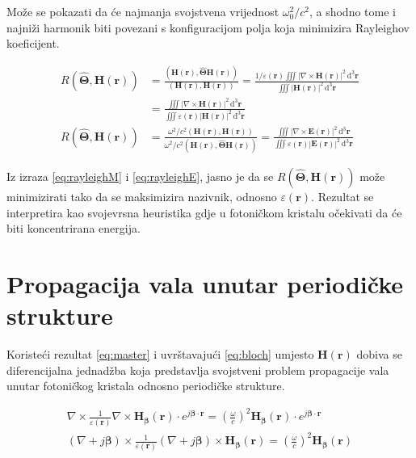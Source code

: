 \documentclass[utf8, seminar]{fer}
\begin{document}
Može se pokazati da će najmanja svojstvena vrijednost $\omega_0^2/c^2$, a
shodno tome i najniži harmonik biti povezani s konfiguracijom polja koja
minimizira Rayleighov koeficijent.

\begin{align} \label{eq:rayleighM}
	R \left( \hat{\mathbf{\Theta}}, \mathbf{H}(\mathbf{r}) \right)
	&= \frac{ \left(
		\mathbf{H}(\mathbf{r}), \hat{\mathbf{\Theta}}\mathbf{H}(\mathbf{r})
		\right)}
	{
		(\mathbf{H}(\mathbf{r}), \mathbf{H}(\mathbf{r}))
	}
	= \frac{ 1/\varepsilon(\mathbf{r})
		\iiint |\nabla \times \mathbf{H}(\mathbf{r})|^2
		\, \mathrm{d}^3\mathbf{r}}
	{\iiint | \mathbf{H}( \mathbf{r} ) |^2
		\, \mathrm{d}^3\mathbf{r}} 								\nonumber \\
	&= \frac{
		\iiint |\nabla \times \mathbf{H}(\mathbf{r})|^2
		\, \mathrm{d}^3\mathbf{r}}
	{\iiint \varepsilon(\mathbf{r}) | \mathbf{H}( \mathbf{r} ) |^2
		\, \mathrm{d}^3\mathbf{r}}										  \\
	R \left( \hat{\mathbf{\Theta}}, \mathbf{H}(\mathbf{r}) \right)
	&= \frac{
		\omega^2/c^2
		\left(
			\mathbf{H}(\mathbf{r}), \mathbf{H}(\mathbf{r})
		\right)
	}
	{
		\omega^2/c^2
		\left(
			\mathbf{H}(\mathbf{r}), \hat{\mathbf{\Theta}}\mathbf{H}(\mathbf{r})
		\right)
	}
	= \frac{
		\iiint |\nabla \times \mathbf{E}(\mathbf{r})|^2
		\, \mathrm{d}^3\mathbf{r}}
	{\iiint \varepsilon(\mathbf{r}) | \mathbf{E}( \mathbf{r} ) |^2
	\, \mathrm{d}^3\mathbf{r}} \label{eq:rayleighE}
\end{align}

Iz izraza \ref{eq:rayleighM} i \ref{eq:rayleighE}, jasno je da se
${R \left( \hat{\mathbf{\Theta}}, \mathbf{H}(\mathbf{r}) \right)}$ može
minimizirati tako da se maksimizira nazivnik, odnosno
${\varepsilon (\mathbf{r})}$. Rezultat se interpretira kao svojevrsna heuristika
gdje u fotoničkom kristalu očekivati da će biti koncentrirana energija.

\section{Propagacija vala unutar periodičke strukture}

Koristeći rezultat \ref{eq:master} i uvrštavajući \ref{eq:bloch} umjesto
$\mathbf{H}(\mathbf{r})$ dobiva se diferencijalna jednadžba koja predstavlja
svojstveni problem propagacije vala unutar fotoničkog kristala odnosno
periodičke strukture.

\begin{align} \label{eq:master_bloch}
	\nabla \times
	\frac{1}{\varepsilon(\mathbf{r})} \nabla \times
	\mathbf{H}_\mathbf{\beta}(\mathbf{r}) \cdot
	e^{j \mathbf{\beta} \cdot \mathbf{r}}
	= \left(
		\frac{\omega}{c}
	\right)^2
	\mathbf{H}_\mathbf{\beta}(\mathbf{r}) \cdot
		e^{j \mathbf{\beta} \cdot \mathbf{r}}	\nonumber \\
	(\nabla + j\mathbf{\beta}) \times
	\frac{1}{\varepsilon(\mathbf{r})}
	(\nabla + j\mathbf{\beta}) \times
	\mathbf{H}_\mathbf{\beta}(\mathbf{r})
	= \left(
		\frac{\omega}{c}
	\right)^2
	\mathbf{H}_\mathbf{\beta}(\mathbf{r})
\end{align}
\end{document}
